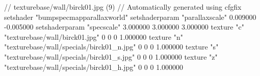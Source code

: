 // texturebase/wall/birck01.jpg (9)
// Automatically generated using cfgfix
setshader "bumpspecmapparallaxworld"
setshaderparam "parallaxscale" 0.009000 -0.005000
setshaderparam "specscale" 3.000000 3.000000 3.000000
texture "c" "texturebase/wall/birck01.jpg" 0 0 0 1.000000
texture "n" "texturebase/wall/specials/birck01_n.jpg" 0 0 0 1.000000
texture "s" "texturebase/wall/specials/birck01_s.jpg" 0 0 0 1.000000
texture "z" "texturebase/wall/specials/birck01_h.jpg" 0 0 0 1.000000

